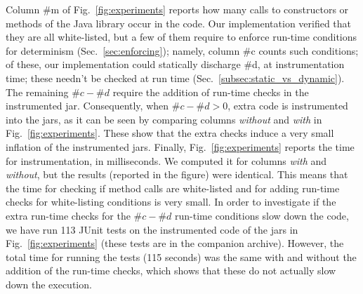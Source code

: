 Column \#m of Fig.~\ref{fig:experiments} reports how many calls to constructors
or methods of the Java library occur in the code. Our implementation
verified that they are all white-listed,
but a few of them require to enforce run-time conditions for determinism
(Sec.~\ref{sec:enforcing}); namely, column \#c counts such conditions;
of these, our implementation could statically discharge \#d, at instrumentation time; these needn't
be checked at run time (Sec.~\ref{subsec:static_vs_dynamic}). The remaining
$\#c - \#d$ require the addition of run-time checks in the instrumented jar. Consequently,
when $\#c - \#d > 0$, extra code is instrumented into the jars, as it can be seen by comparing
columns \emph{without} and \emph{with} in Fig.~\ref{fig:experiments}. These
show that the extra checks induce a very small inflation of the instrumented jars.
Finally, Fig.~\ref{fig:experiments} reports the time for instrumentation, in milliseconds.
We computed it for columns \emph{with} and \emph{without}, but the results
(reported in the figure) were identical. This means that the time for
checking if method calls are white-listed and for adding run-time checks for white-listing
conditions is very small.
In order to investigate if the extra run-time checks for the $\#c - \#d$ run-time conditions
slow down the code, we have run 113 JUnit tests on the instrumented code of the jars in Fig.~\ref{fig:experiments}
(these tests are in the companion archive). However, the total time for running the
tests (115 seconds) was the same with and without the addition of the run-time checks, which shows that
these do not actually slow down the execution.
